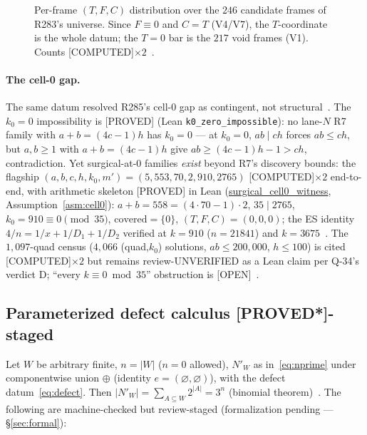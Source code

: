 \documentclass[11pt,a4paper]{article}
\theoremstyle{definition}
\begin{document}
\begin{figure}[t]
  \centering
  \caption{Per-frame $(T,F,C)$ distribution over the $246$ candidate
    frames of R283's universe. Since $F\equiv0$ and $C=T$ (V4/V7), the
    $T$-coordinate is the whole datum; the $T{=}0$ bar is the $217$
    void frames (V1). Counts [COMPUTED]$\times2$~\cite{D289}.}
  \label{fig:tfc}
\end{figure}

\paragraph{The cell-0 gap.} The same datum resolved R285's cell-0 gap as
contingent, not structural~\cite{D289}. The $k_0=0$ impossibility is
[PROVED] (Lean \texttt{k0\_zero\_impossible}): no lane-$N$ R7 family
with $a+b=(4c-1)h$ has $k_0=0$ — at $k_0=0$, $ab\mid ch$ forces
$ab\le ch$, but $a,b\ge1$ with $a+b=(4c-1)h$ give
$ab\ge(4c-1)h-1>ch$, contradiction. Yet surgical-at-$0$ families
\emph{exist} beyond R7's discovery bounds: the flagship
$(a,b,c,h,k_0,m')=(5,553,70,2,910,2765)$ [COMPUTED]$\times2$
end-to-end, with arithmetic skeleton [PROVED] in Lean
(\url{surgical_cell0_witness}, Assumption~\ref{asm:cell0}):
$a+b=558=(4\cdot70-1)\cdot2$, $35\mid2765$,
$k_0=910\equiv0\pmod{35}$, $\mathrm{covered}=\{0\}$,
$(T,F,C)=(0,0,0)$; the ES identity $4/n=1/x+1/D_1+1/D_2$ verified at
$k=910$ ($n=21841$) and $k=3675$~\cite{D289}. The $1{,}097$-quad census
($4{,}066$ (quad,$k_0$) solutions, $ab\le200{,}000$, $h\le100$) is cited
[COMPUTED]$\times2$ but remains review-UNVERIFIED as a Lean claim
per Q-34's verdict D; ``every $k\equiv0\bmod35$'' obstruction is
[OPEN]~\cite{D289,D314}.

\subsection{Parameterized defect calculus [PROVED*]-staged}

Let $W$ be arbitrary finite, $n=|W|$ ($n=0$ allowed), $N'_W$ as
in~\eqref{eq:nprime} under componentwise union $\oplus$ (identity
$e=(\varnothing,\varnothing)$), with the defect datum~\eqref{eq:defect}.
Then $|N'_W|=\sum_{A\subseteq W}2^{|A|}=3^n$ (binomial theorem)~\cite{D300}.
The following are machine-checked but review-staged (formalization
pending — \S\ref{sec:formal}):
\end{document}
